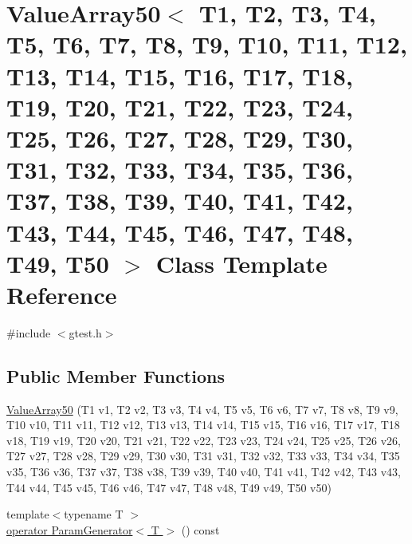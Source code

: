 \hypertarget{classtesting_1_1internal_1_1ValueArray50}{\section{\-Value\-Array50$<$ \-T1, \-T2, \-T3, \-T4, \-T5, \-T6, \-T7, \-T8, \-T9, \-T10, \-T11, \-T12, \-T13, \-T14, \-T15, \-T16, \-T17, \-T18, \-T19, \-T20, \-T21, \-T22, \-T23, \-T24, \-T25, \-T26, \-T27, \-T28, \-T29, \-T30, \-T31, \-T32, \-T33, \-T34, \-T35, \-T36, \-T37, \-T38, \-T39, \-T40, \-T41, \-T42, \-T43, \-T44, \-T45, \-T46, \-T47, \-T48, \-T49, \-T50 $>$ \-Class \-Template \-Reference}
\label{df/d05/classtesting_1_1internal_1_1ValueArray50}
}


{\ttfamily \#include $<$gtest.\-h$>$}

\subsection*{\-Public \-Member \-Functions}
\begin{DoxyCompactItemize}
\item 
\hyperlink{classtesting_1_1internal_1_1ValueArray50_a672a04efc04027e350fd8ec40173ddd9}{\-Value\-Array50} (\-T1 v1, \-T2 v2, \-T3 v3, \-T4 v4, \-T5 v5, \-T6 v6, \-T7 v7, \-T8 v8, \-T9 v9, \-T10 v10, \-T11 v11, \-T12 v12, \-T13 v13, \-T14 v14, \-T15 v15, \-T16 v16, \-T17 v17, \-T18 v18, \-T19 v19, \-T20 v20, \-T21 v21, \-T22 v22, \-T23 v23, \-T24 v24, \-T25 v25, \-T26 v26, \-T27 v27, \-T28 v28, \-T29 v29, \-T30 v30, \-T31 v31, \-T32 v32, \-T33 v33, \-T34 v34, \-T35 v35, \-T36 v36, \-T37 v37, \-T38 v38, \-T39 v39, \-T40 v40, \-T41 v41, \-T42 v42, \-T43 v43, \-T44 v44, \-T45 v45, \-T46 v46, \-T47 v47, \-T48 v48, \-T49 v49, \-T50 v50)
\item 
{\footnotesize template$<$typename T $>$ }\\\hyperlink{classtesting_1_1internal_1_1ValueArray50_a08ef46fa12c9dd8ef6fc630baeea89b7}{operator Param\-Generator$<$ T $>$} () const 
\end{DoxyCompactItemize}
